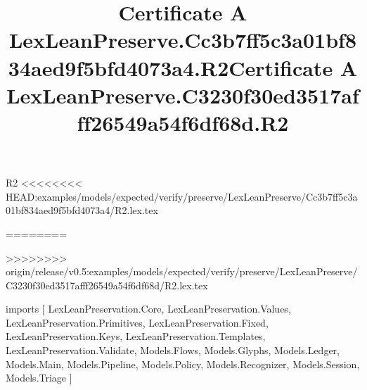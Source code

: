 \begin{lexlean}{R2}
<<<<<<<< HEAD:examples/models/expected/verify/preserve/LexLeanPreserve/Cc3b7ff5c3a01bf834aed9f5bfd4073a4/R2.lex.tex
\title{Certificate A LexLeanPreserve.Cc3b7ff5c3a01bf834aed9f5bfd4073a4.R2}
========
\title{Certificate A LexLeanPreserve.C3230f30ed3517afff26549a54f6df68d.R2}
>>>>>>>> origin/release/v0.5:examples/models/expected/verify/preserve/LexLeanPreserve/C3230f30ed3517afff26549a54f6df68d/R2.lex.tex
\begin{coremodule}
imports [
  LexLeanPreservation.Core,
  LexLeanPreservation.Values,
  LexLeanPreservation.Primitives,
  LexLeanPreservation.Fixed,
  LexLeanPreservation.Keys,
  LexLeanPreservation.Templates,
  LexLeanPreservation.Validate,
  Models.Flows,
  Models.Glyphs,
  Models.Ledger,
  Models.Main,
  Models.Pipeline,
  Models.Policy,
  Models.Recognizer,
  Models.Session,
  Models.Triage
]


\end{coremodule}
\end{lexlean}
